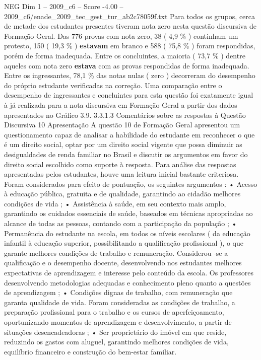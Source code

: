 \begin{textsample}{NEG Dim 1 – 2009\_c6 – Score -4.00 – 2009\_c6/enade\_2009\_tec\_gest\_tur\_ab2c78059f.txt}
Para todos os grupos, cerca de metade dos estudantes presentes tiveram nota zero nesta questão discursiva de Formação Geral.
Das 776 provas com nota zero, 38 ( 4,9 \% ) continham um protesto, 150 ( 19,3 \% ) \textbf{estavam} em branco e 588 ( 75,8 \% ) foram respondidas, porém de forma inadequada.
Entre os concluintes, a maioria ( 73,7 \% ) dentre aqueles com nota zero \textbf{estava} com as provas respondidas de forma inadequada.
Entre os ingressantes, 78,1 \% das notas nulas ( zero ) decorreram do desempenho do próprio estudante verificadas na correção.
Uma comparação entre o desempenho de ingressantes e concluintes para esta questão foi exatamente igual à já realizada para a nota discursiva em Formação Geral a partir dos dados apresentados no Gráfico 3.9. 3.3.1.3 Comentários sobre as respostas à Questão Discursiva 10 Apresentação A questão 10 de Formação Geral apresentou um questionamento capaz de analisar a habilidade do estudante em reconhecer o que é um direito social, optar por um direito social vigente que possa diminuir as desigualdades de renda familiar no Brasil e discutir os argumentos em favor do direito social escolhido como suporte à resposta.
Para análise das respostas apresentadas pelos estudantes, houve uma leitura inicial bastante criteriosa.
Foram considerados para efeito de pontuação, os seguintes argumentos : • Acesso à educação pública, gratuita e de qualidade, garantindo ao cidadão melhores condições de vida ; • Assistência à saúde, em seu contexto mais amplo, garantindo os cuidados essenciais de saúde, baseados em técnicas apropriadas ao alcance de todas as pessoas, contando com a participação da população ; • Permanência do estudante na escola, em todos os níveis escolares ( da educação infantil à educação superior, possibilitando a qualificação profissional ), o que garante melhores condições de trabalho e remuneração.
Considerou -se a qualificação e o desempenho docente, desenvolvendo nos estudantes melhores expectativas de aprendizagem e interesse pelo conteúdo da escola.
Os professores desenvolvendo metodologias adequadas e conhecimento pleno quanto a questões de aprendizagem ; • Condições dignas de trabalho, com remuneração que garanta qualidade de vida.
Foram consideradas as condições de trabalho, a preparação profissional para o trabalho e os cursos de aperfeiçoamento, oportunizando momentos de aprendizagem e desenvolvimento, a partir de situações desencadeadoras ; • Ser proprietário do imóvel em que reside, reduzindo os gastos com aluguel, garantindo melhores condições de vida, equilíbrio financeiro e construção do bem-estar familiar.

\end{textsample}
